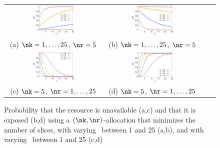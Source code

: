 {\begin{figure}[t]
	\centering
	\hspace*{-25pt}
	\setlength{\tabcolsep}{20pt}
	\begin{tabular}{cccc}
	    \includegraphics[width=0.45\textwidth]{figures/bdfprs-fig06a} &
	    \includegraphics[width=0.45\textwidth]{figures/bdfprs-fig06b} \\[3pt]
	    \footnotesize{\hspace{20pt}(a) $\nk=1,\ldots,25$, $\nr=5$} &
	    \footnotesize{\hspace{20pt}(b) $\nk=1,\ldots,25$, $\nr=5$} \\[20pt]
	    \includegraphics[width=0.45\textwidth]{figures/bdfprs-fig06c} &
	    \includegraphics[width=0.45\textwidth]{figures/bdfprs-fig06d} \\[3pt]
	    \footnotesize{\hspace{20pt}(c) $\nk=5$, $\nr=1,\ldots,25$} & 
	    \footnotesize{\hspace{20pt}(d) $\nk=5$, $\nr=1,\ldots,25$} \\[20pt]
	\end{tabular}
    \caption{\label{dcs:fig:diagonal} Probability that the resource is unavailable (a,c) and that it is exposed (b,d) using a $(\nk,\nr)$-allocation that minimizes the number of slices, with  varying \nk\ between 1 and 25 (a,b), and with  varying \nr\ between 1 and 25 (c,d)}
\end{figure}

}
